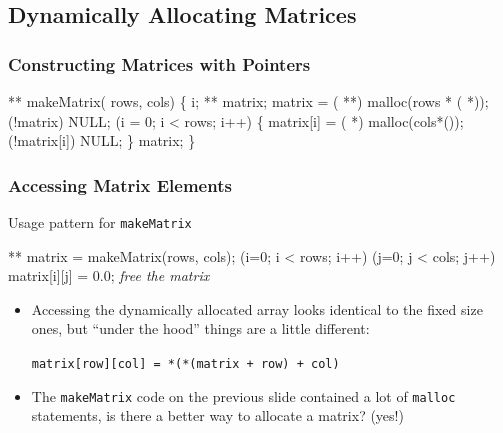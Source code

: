 \documentclass[smaller,table]{beamer}
\begin{document}
\subsection{Dynamically Allocating Matrices}
\begin{frame}[fragile]
\frametitle{Constructing Matrices with Pointers}
\vspace{-0.2in}
\begin{semiverbatim}
\footnotesize
\kr\kl{} ** makeMatrix( rows,  cols)
\kl\{
\kl   {} i;
\kl   {} ** matrix;
\kl        
\kl   matrix = ( **) malloc(rows * ( *));
\kl   {} (!matrix)  NULL; 
\kl
\kl   {} (i = 0; i < rows; i++)
\kl   \{
\kl      matrix[i] = ( *) malloc(cols*());
\kl      {} (!matrix[i])
\kl         {} NULL;  
\kl                         {}
\kl   \}
\kl
\kl   {} matrix;
\kl\}
\end{semiverbatim}
\end{frame}

\begin{frame}[fragile]
\frametitle{Accessing Matrix Elements}
\begin{block}{Usage pattern for {\tt makeMatrix}}
\begin{semiverbatim}
 ** matrix = makeMatrix(rows, cols);
 (i=0; i < rows; i++)
    (j=0; j < cols; j++)
      matrix[i][j] = 0.0;
\emph{free the matrix}      
\end{semiverbatim}
\end{block}
\begin{itemize}
\item Accessing the dynamically allocated array looks identical to the fixed size ones, but ``under the hood'' things are a little different:
\begin{alertblock}{}
\begin{center}
\tt matrix[row][col] = *(*(matrix + row) + col)
\end{center}
\end{alertblock}
\item The {\tt makeMatrix} code on the previous slide contained a lot of {\tt malloc} statements, is there a better way to allocate a matrix? (yes!)
\end{itemize}
\end{frame}
\end{document}
